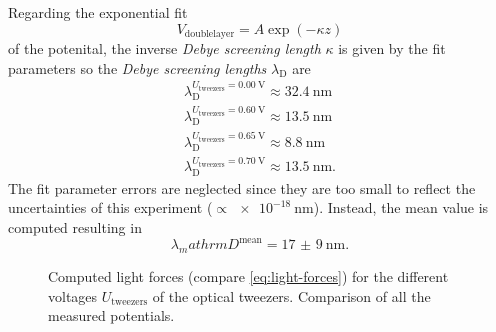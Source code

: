 \documentclass[../bericht.tex]{subfiles}
\begin{document}
      Regarding the exponential fit
      \begin{equation*}
        V_\mathrm{doublelayer}=A\exp\left(-\kappa z \right)
      \end{equation*}
      of the potenital, the inverse \textit{Debye screening length} $\kappa$ is given by the fit parameters so the \textit{Debye screening lengths} $\lambda_\mathrm{D}$ are
      \begin{align*}
        \lambda_\mathrm{D}^{U_\mathrm{tweezers}=\SI{0,00}{\volt}}\approx\SI{32,4}{\nano\meter}  \\
        \lambda_\mathrm{D}^{U_\mathrm{tweezers}=\SI{0,60}{\volt}}\approx\SI{13,5}{\nano\meter}  \\
        \lambda_\mathrm{D}^{U_\mathrm{tweezers}=\SI{0,65}{\volt}}\approx\SI{8,8}{\nano\meter} \\
        \lambda_\mathrm{D}^{U_\mathrm{tweezers}=\SI{0,70}{\volt}}\approx\SI{13,5}{\nano\meter} .
      \end{align*}
      The fit parameter errors are neglected since they are too small to reflect the uncertainties of this experiment ($\propto \SI{e-18}{\nano\meter}$). Instead, the mean value is computed  resulting in
      \begin{equation*}
        \lambda_mathrm{D}^\mathrm{mean}=\SI{17(9)}{\nano\meter}.
      \end{equation*}
      \medskip

      \begin{figure}[htb]
        \centering
        \hfill
        \caption{\protect{} Computed light forces (compare \cref{eq:light-forces}) for the different voltages $U_\mathrm{tweezers}$ of the optical tweezers. \protect{} Comparison of all the measured potentials.}
      \end{figure}
\end{document}
